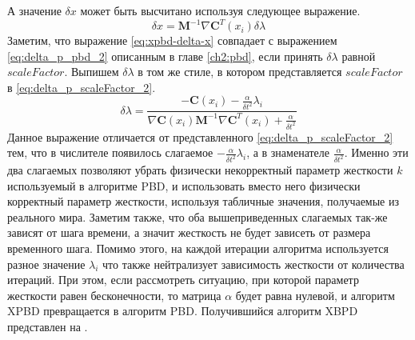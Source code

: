 	А значение $\delta x$ может быть высчитано используя следующее выражение.
\begin{equation} \label{eq:xpbd-delta-x}
	 \delta x = \textbf{M}^{-1} \nabla \textbf{C}^T(x_i) \delta \lambda
\end{equation}	
	Заметим, что выражение \ref{eq:xpbd-delta-x} совпадает с выражением \ref{eq:delta_p_pbd_2} описанным в главе \ref{ch2:pbd}, если принять $\delta \lambda$ равной $scaleFactor$. Выпишем $\delta \lambda$ в том же стиле, в котором представляется $scaleFactor$ в \ref{eq:delta_p_scaleFactor_2}.
\begin{equation} \label{eq:xpbd-delta-lambda-2}
	\delta \lambda = \frac{-\textbf{C}(x_i) - \frac{\alpha}{\delta t^2}\lambda_i}{\nabla \textbf{C}(x_i) \textbf{M}^{-1} \nabla \textbf{C}^T(x_i) + \frac{\alpha}{\delta t^2}}
\end{equation}	
	Данное выражение отличается от представленного  \ref{eq:delta_p_scaleFactor_2} тем, что в числителе появилось слагаемое $- \frac{\alpha}{\delta t^2}\lambda_i$, а в знаменателе $\frac{\alpha}{\delta t^2}$. Именно эти два слагаемых позволяют убрать физически некорректный параметр жесткости $k$ используемый в алгоритме PBD, и использовать вместо него физически корректный параметр жесткости, используя табличные значения, получаемые из реального мира. Заметим также, что оба вышеприведенных слагаемых так-же зависят от шага времени, а значит жесткость не будет зависеть от размера временного шага. Помимо этого, на каждой итерации алгоритма используется разное значение $\lambda_i$ что также нейтрализует зависимость жесткости от количества итераций. При этом, если рассмотреть ситуацию, при которой параметр жесткости равен бесконечности, то матрица $\alpha$ будет равна нулевой, и алгоритм XPBD превращается в алгоритм PBD.
	Получившийся алгоритм XBPD представлен на .
	
